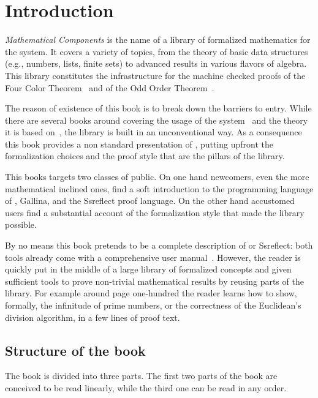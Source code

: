 \setcounter{chapter}{-1}
\chapter{Introduction}

\emph{Mathematical Components}
is the name of a library of formalized mathematics for the 
\Coq{} system.  It covers a variety of
topics, from the theory of basic data structures (e.g., numbers, lists, finite
sets) to advanced results in various flavors of algebra. This library
constitutes the infrastructure for the machine checked proofs of the
Four Color Theorem~\cite{Gonthier08} and of the 
Odd Order Theorem~\cite{gonthier:hal-00816699}.

The reason of existence of this book is to break down the barriers to entry.
While there are several books around covering the usage of the 
\Coq{} system~\cite{BC04,SF,CPDT}
and the theory it is based 
on~\cite[Chapter 4]{Coq:manual}\cite{paulinmohring:hal-01094195,hottbook}, 
the \mcbMC{} library is built
in an unconventional way.  As a consequence this book provides a non
standard presentation of \Coq{}, putting upfront the formalization choices
and the proof style that are the pillars of the library.

This books targets two classes of public.  On one hand newcomers, even the 
more mathematical inclined ones, find a soft introduction to the programming
language of \Coq{}, Gallina, and the Ssreflect proof language.
On the other hand accustomed \Coq{} users find a substantial account
of the formalization style that made the \mcbMC{} library possible.

By no means this book pretends to be a complete description of \Coq{} or
Ssreflect: both tools already come with a comprehensive user 
manual~\cite{Coq:manual,ssrman}.
However, the reader is quickly put in the middle of a large library
of formalized concepts and given sufficient tools to prove non-trivial
mathematical results by reusing parts of the library.  
For example around page one-hundred the reader learns
how to show, formally, the infinitude of prime numbers, or the correctness of
the Euclidean's division algorithm, in a few lines of proof text.

\section{Structure of the book}

The book is divided into three parts.
The first two parts of the book are conceived to be read linearly,
while the third one can be read in any order.

